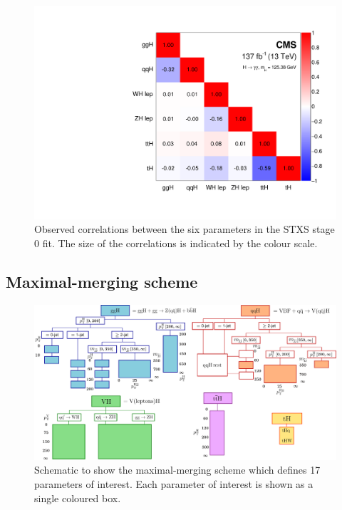 \begin{figure}
  \centering
  \includegraphics[width=.55\textwidth]{Figures/hgg_results/stage0_correlations.pdf}
  \caption[Correlations in the STXS stage 0 parameters]
  {
    Observed correlations between the six parameters in the STXS stage 0 fit. The size of the correlations is indicated by the colour scale.
  }
  \label{fig:stage0_correlations}
\end{figure}

\subsection{Maximal-merging scheme}
\begin{figure}
  \centering
  \includegraphics[width=1\linewidth]{Figures/app_merging_schemes/allSTXSbins_maximal.pdf}
  \caption[Schematic of the maximal-merging scheme]
  {
    Schematic to show the maximal-merging scheme which defines 17 parameters of interest. Each parameter of interest is shown as a single coloured box.
  }
  \label{fig:maximal_scheme}
\end{figure}

